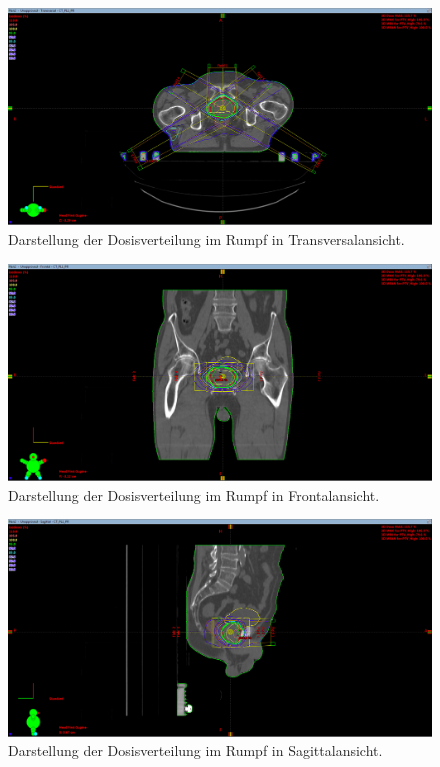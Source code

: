 \begin{figure}[H]
  \centering
  \includegraphics[width=\textwidth]{Bilder/Prostata2_Z.png}
  \caption{Darstellung der Dosisverteilung im Rumpf in Transversalansicht.}
  \label{abb:Z2}
\end{figure}

\begin{figure}[H]
  \centering
  \includegraphics[width=\textwidth]{Bilder/Prostata2_Y.png}
  \caption{Darstellung der Dosisverteilung im Rumpf in Frontalansicht.}
  \label{abb:Y2}
\end{figure}

\begin{figure}[H]
  \centering
  \includegraphics[width=\textwidth]{Bilder/Prostata2_X.png}
  \caption{Darstellung der Dosisverteilung im Rumpf in Sagittalansicht.}
  \label{abb:X2}
\end{figure}

